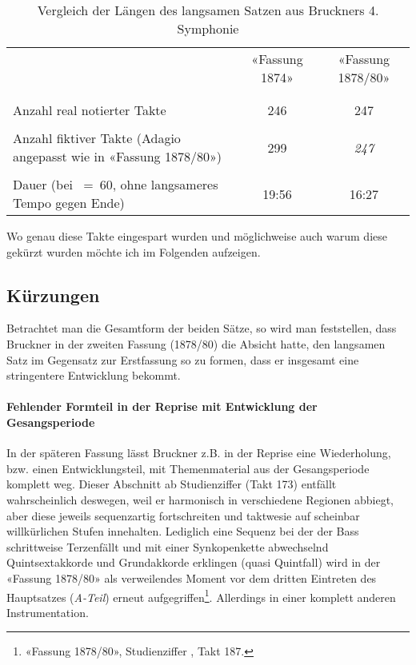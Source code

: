 \begin{table}[htbp]
	\caption{Vergleich der Längen des langsamen Satzen aus Bruckners 4. Symphonie}
	\label{tab:duration}
	\centering
	\begin{tabular}{p{5.5cm}|cc}
		& «Fassung 1874» & «Fassung 1878/80» \\
		&& \\[-0.5em]
		\hline
		&& \\[-0.5em]
		Anzahl real notierter Takte & 246 & 247 \\
		&& \\[-0.5em]
		Anzahl fiktiver Takte \small{(Adagio angepasst wie in «Fassung 1878/80»)} & 299 & \emph{247} \\
		&& \\[-0.5em]
		Dauer \small{(bei \quarternote~=~60, ohne langsameres Tempo gegen Ende)} & 19:56 & 16:27 \\
	\end{tabular}
\end{table}

Wo genau diese Takte eingespart wurden und möglichweise auch warum diese gekürzt wurden möchte ich im Folgenden aufzeigen.


\subsection{Kürzungen}

Betrachtet man die Gesamtform der beiden Sätze, so wird man feststellen, dass Bruckner in der zweiten Fassung (1878/80) die Absicht hatte, den langsamen Satz im Gegensatz zur Erstfassung so zu formen, dass er insgesamt eine stringentere Entwicklung bekommt.

\paragraph{Fehlender Formteil in der Reprise mit Entwicklung der Gesangsperiode}

In der späteren Fassung lässt Bruckner z.B. in der Reprise eine Wiederholung, bzw. einen Entwicklungsteil, mit Themenmaterial aus der Gesangsperiode komplett weg.
Dieser Abschnitt ab Studienziffer  (Takt 173) entfällt wahrscheinlich deswegen, weil er harmonisch in verschiedene Regionen abbiegt, aber diese jeweils sequenzartig fortschreiten und taktwesie auf scheinbar willkürlichen Stufen innehalten.
Lediglich eine Sequenz bei der der Bass schrittweise Terzenfällt und mit einer Synkopenkette abwechselnd Quintsextakkorde und Grundakkorde erklingen (quasi Quintfall) wird in der «Fassung 1878/80» als verweilendes Moment vor dem dritten Eintreten des Hauptsatzes (\emph{A-Teil}) erneut aufgegriffen\footnote{«Fassung 1878/80», Studienziffer , Takt 187.}.
Allerdings in einer komplett anderen Instrumentation.

